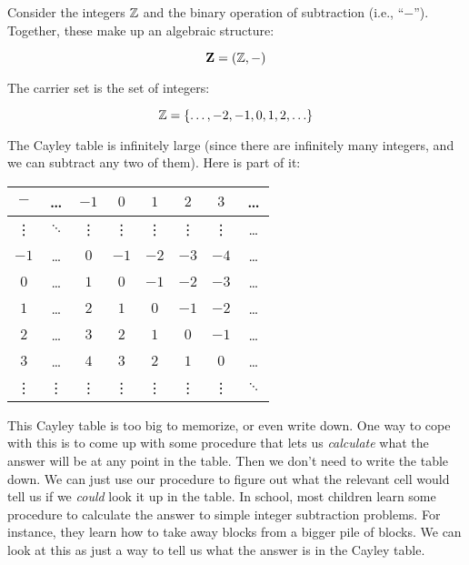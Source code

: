 \documentclass[../../../main.tex]{subfiles}
\begin{document}
\begin{example}
\label{ex:subtraction-over-integers}

Consider the integers $\Ints/$ and the binary operation of subtraction (i.e., ``$-$''). Together, these make up an algebraic structure:

\begin{equation*}
  \algebra{Z} = (\Ints/, -)
\end{equation*} 

The carrier set is the set of integers:

\begin{equation*}
  \Ints/ = \{ \ldots, -2, -1, 0, 1, 2, \ldots \}
\end{equation*}

The Cayley table is infinitely large (since there are infinitely many integers, and we can subtract any two of them). Here is part of it:

\begin{center}
  \begin{tabular}{| c || c | c | c | c | c | c | c |}
    \hline
    $-$    & \ldots   & $-1$   & $0$    & $1$    & $2$    & $3$    & \ldots
    \\ \hline \hline
    \vdots & $\ddots$ & \vdots & \vdots & \vdots & \vdots & \vdots & \ldots
    \\ \hline
    $-1$   & \ldots   & $0$    & $-1$   & $-2$   & $-3$   & $-4$   & \ldots
    \\ \hline
    $0$    & \ldots   & $1$    & $0$    & $-1$   & $-2$   & $-3$   & \ldots
    \\ \hline
    $1$    & \ldots   & $2$    & $1$    & $0$    & $-1$   & $-2$   & \ldots
    \\ \hline
    $2$    & \ldots   & $3$    & $2$    & $1$    & $0$    & $-1$   & \ldots
    \\ \hline
    $3$    & \ldots   & $4$    & $3$    & $2$    & $1$    & $0$    & \ldots
    \\ \hline
    \vdots & \vdots   & \vdots & \vdots & \vdots & \vdots & \vdots & $\ddots$
    \\ \hline
  \end{tabular}
\end{center}

\begin{aside}
  \begin{remark}
    This Cayley table is too big to memorize, or even write down. One way to cope with this is to come up with some procedure that lets us \emph{calculate} what the answer will be at any point in the table. Then we don't need to write the table down. We can just use our procedure to figure out what the relevant cell would tell us if we \emph{could} look it up in the table.
    \vskip 0.5cm
    In school, most children learn some procedure to calculate the answer to simple integer subtraction problems. For instance, they learn how to take away blocks from a bigger pile of blocks. We can look at this as just a way to tell us what the answer is in the Cayley table.
  \end{remark}
\end{aside}


\end{example}
\end{document}
